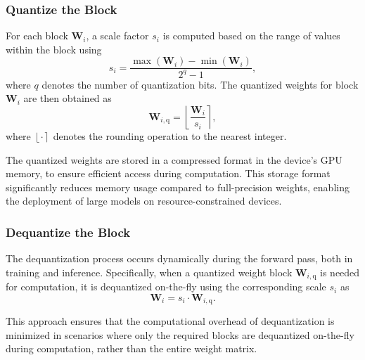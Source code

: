 \documentclass[journal]{IEEEtran}
\begin{document}
\subsubsection{Quantize the Block}
For each block \( \mathbf{W}_i \), a scale factor \( s_i \) is computed based on the range of values within the block using
\begin{equation}
s_i = \frac{\max(\mathbf{W}_i) - \min(\mathbf{W}_i)}{2^q - 1},
\end{equation}
where \( q \) denotes the number of quantization bits. The quantized weights for block \( \mathbf{W}_i \) are then obtained as
\begin{equation}
\mathbf{W}_{i,\text{q}} = \left\lfloor \frac{\mathbf{W}_i}{s_i} \right\rceil,
\end{equation}
where \( \left\lfloor \cdot \right\rceil \) denotes the rounding operation to the nearest integer.

The quantized weights are stored in a compressed format in the device's GPU memory, to ensure efficient access during computation. This storage format significantly reduces memory usage compared to full-precision weights, enabling the deployment of large models on resource-constrained devices.


\subsubsection{Dequantize the Block} 
The dequantization process occurs dynamically during the forward pass, both in training and inference. Specifically, when a quantized weight block \( \mathbf{W}_{i,\text{q}} \) is needed for computation, it is dequantized on-the-fly using the corresponding scale \( s_i \) as
\begin{equation}
\mathbf{W}_i = s_i \cdot \mathbf{W}_{i,\text{q}}.
\end{equation}

This approach ensures that the computational overhead of dequantization is minimized in scenarios where only the required blocks are dequantized on-the-fly during computation, rather than the entire weight matrix. 
\end{document}
